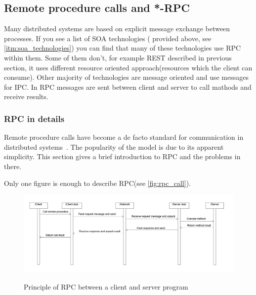 \subsection{Remote procedure calls and *-RPC}
\label{sec:rpc}
Many distributed systems are based on explicit message exchange
between processes. If you see a list of SOA technologies ( provided above, see
\autoref{itm:soa_technologies}) you can find that many of these technologies use
RPC within them. Some of them don't, for example REST described in  previous
section, it uses different resource oriented approach(resources which
the client can consume). Other majority of technologies are message oriented and
use messages for \gls{IPC}. In RPC messages are sent between client and server
to call mathods and receive results. 

\subsubsection{RPC in details}
Remote procedure calls have become a de facto standard for communication
in distributed systems~\cite{tanenbaum07}. The popularity of the model is due to
its apparent simplicity.
This section gives a brief introduction to RPC and the problems in there.

Only one figure is enough to describe RPC(see \autoref{fig:rpc_call}).

% 



\begin{figure}
\centering
\scalebox{0.4}
{\includegraphics{../images/background/rpc_diagram.png}}
\caption{Principle of RPC between a client and server program}
\label{fig:rpc_call}
\end{figure}


